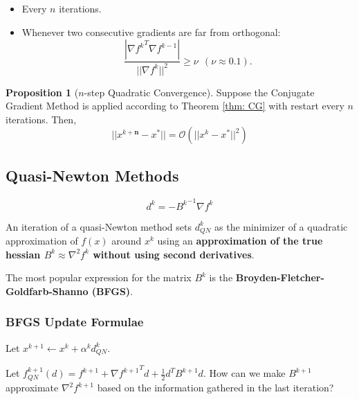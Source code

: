 \documentclass[a4paper, 10pt, twocolumn]{article}
\theoremstyle{definition}
\newtheorem{prop}[theorem]{Proposition}
\theoremstyle{remark}
\newcommand{\al}{\alpha}
\begin{document}
\begin{itemize}
\item Every $n$ iterations.
\item Whenever two consecutive gradients are far from orthogonal:
$$
\frac{|{\nabla f^k}^T\nabla f^{k-1}|}{||\nabla f^k||^2} \geq \nu \ \ (\nu \approx 0.1).
$$
\end{itemize}

\begin{prop}[$n$-step Quadratic Convergence]
Suppose the Conjugate Gradient Method is applied according to Theorem \ref{thm: CG} with restart every $n$ iterations. Then,
$$
||x^{k+\mathbf{n}} - x^*|| = \mathcal{O}(||x^k-x^*||^2)
$$
\end{prop}


\subsection{Quasi-Newton Methods}

$$
\boxed{d^k = -{B^{k}}^{-1}\nabla f^k}
$$

An iteration of a quasi-Newton method sets $d^k_{QN}$ as the minimizer of a quadratic approximation of $f(x)$ around $x^k$ using an \textbf{approximation of the true hessian $B^k \approx \nabla^2f^k$ without using second derivatives}.

The most popular expression for the matrix $B^k$ is the \textbf{Broyden-Fletcher-Goldfarb-Shanno (BFGS)}.

\subsubsection*{BFGS Update Formulae}

Let $x^{k+1}\leftarrow x^k +\al^kd^k_{QN}$.

Let $f^{k+1}_{QN}(d) = f^{k+1} + {\nabla f^{k+1}}^Td + \frac{1}{2}d^TB^{k+1}d$. How can we make $B^{k+1}$ approximate $\nabla^2f^{k+1}$ based on the information gathered in the last iteration?
\end{document}
